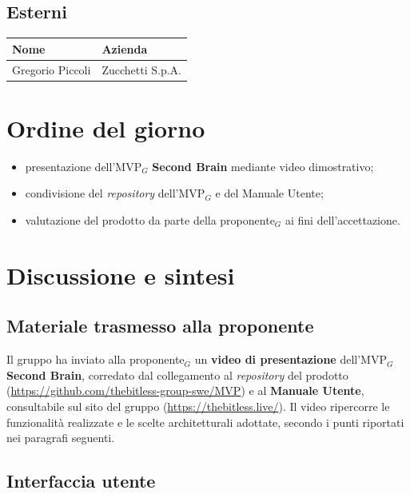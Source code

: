 \documentclass[a4paper, 10pt, colorlinks=true, linkcolor=black, urlcolor=blue, citecolor=blue, hidelinks]{article}
\begin{document}
\subsection{Esterni}
\begin{center}
\begin{tabular}{|l|l|}
\hline
\textbf{Nome} & \textbf{Azienda} \\
\hline
Gregorio Piccoli & Zucchetti S.p.A. \\
\hline
\end{tabular}
\end{center}

\section{Ordine del giorno}

\begin{itemize}
    \item presentazione dell'MVP$_G$ \textbf{Second Brain} mediante video dimostrativo;
    \item condivisione del \textit{repository} dell'MVP$_G$ e del Manuale Utente;
    \item valutazione del prodotto da parte della proponente$_G$ ai fini dell'accettazione.
\end{itemize}

\section{Discussione e sintesi}

\subsection{Materiale trasmesso alla proponente}

Il gruppo ha inviato alla proponente$_G$ un \textbf{video di presentazione} dell'MVP$_G$ \textbf{Second Brain}, corredato dal collegamento al \textit{repository} del prodotto (\url{https://github.com/thebitless-group-swe/MVP}) e al \textbf{Manuale Utente}, consultabile sul sito del gruppo (\url{https://thebitless.live/}). Il video ripercorre le funzionalità realizzate e le scelte architetturali adottate, secondo i punti riportati nei paragrafi seguenti.

\subsection{Interfaccia utente}
\end{document}
